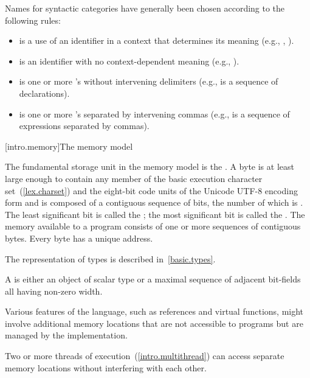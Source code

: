 \pnum
Names for syntactic categories have generally been chosen according to
the following rules:
\begin{itemize}
\item {} is a use of an identifier in a context that
determines its meaning (e.g., ,
).
\item {} is an identifier with no context-dependent meaning
(e.g., ).
\item {} is one or more 's without intervening
delimiters (e.g.,  is a sequence of
declarations).
\item {} is one or more 's separated by
intervening commas (e.g.,  is a sequence of
expressions separated by commas).
\end{itemize}%

[intro.memory]{The \Cpp memory model}

\pnum
{}%
The fundamental storage unit in the \Cpp memory model is the
.
A byte is at least large enough to contain any member of the basic
%
execution character set~(\ref{lex.charset})
and the eight-bit code units of the Unicode UTF-8 encoding form
and is composed of a contiguous sequence of
bits, the number of which is . The least
significant bit is called the ; the most
significant bit is called the . The memory
available to a \Cpp program consists of one or more sequences of
contiguous bytes. Every byte has a unique address.

\pnum
\begin{note} The representation of types is described
in~\ref{basic.types}. \end{note}

\pnum
A  is either an object of scalar type or a maximal
sequence of adjacent bit-fields all having non-zero width. \begin{note} Various
features of the language, such as references and virtual functions, might
involve additional memory locations that are not accessible to programs but are
managed by the implementation. \end{note} Two or more threads of
execution~(\ref{intro.multithread}) can access separate memory
locations without interfering with each other.

